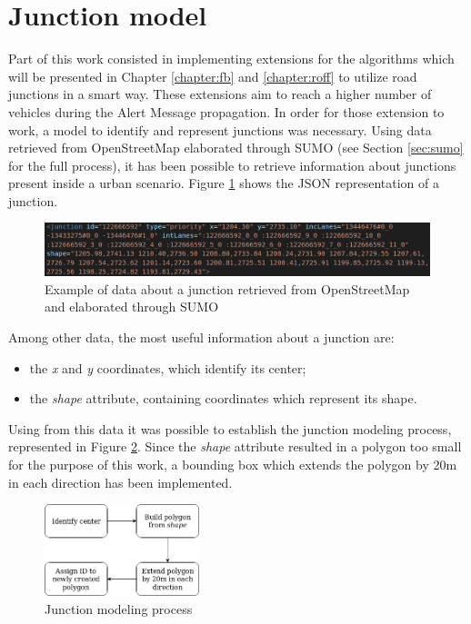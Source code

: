 	\section{Junction model}
		\label{sec:junction-modeling}
		Part of this work consisted in implementing extensions for the algorithms which will be presented in Chapter \ref{chapter:fb} and \ref{chapter:roff} to utilize road junctions in a smart way. These extensions aim to reach a higher number of vehicles during the Alert Message propagation. In order for those extension to work, a model to identify and represent junctions was necessary. Using data retrieved from OpenStreetMap elaborated through SUMO (see Section \ref{sec:sumo} for the full process), it has been possible to retrieve information about junctions present inside a urban scenario. Figure \ref{fig:junction} shows the JSON representation of a junction.
		
		\begin{figure}[H]
			\centering
			\includegraphics[width=\textwidth]{immagini/junction}
			\caption{Example of data about a junction retrieved from OpenStreetMap and elaborated through SUMO}
			\label{fig:junction}
		\end{figure}
		
		Among other data, the most useful information about a junction are:
		\begin{itemize}
			\item the \textit{x} and \textit{y} coordinates, which identify its center;
			\item the \textit{shape} attribute, containing coordinates which represent its shape.
		\end{itemize}
		
		Using from this data it was possible to establish the junction modeling process, represented in Figure \ref{fig:junction-process}. Since the \textit{shape} attribute resulted in a polygon too small for the purpose of this work, a bounding box which extends the polygon by 20m in each direction has been implemented.
		
		\begin{figure}[H]
			\centering
			\includegraphics[width=0.4\textwidth]{immagini/junction-process}
			\caption{Junction modeling process}
			\label{fig:junction-process}
		\end{figure}
	
